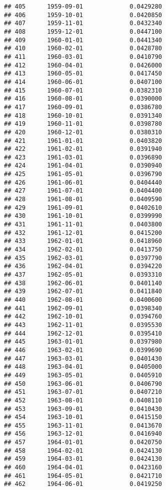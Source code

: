 \documentclass[
]{article}
\begin{document}
\begin{verbatim}
## 405      1959-09-01             0.0429280
## 406      1959-10-01             0.0420850
## 407      1959-11-01             0.0432340
## 408      1959-12-01             0.0447100
## 409      1960-01-01             0.0441340
## 410      1960-02-01             0.0428780
## 411      1960-03-01             0.0410790
## 412      1960-04-01             0.0426000
## 413      1960-05-01             0.0417450
## 414      1960-06-01             0.0407100
## 415      1960-07-01             0.0382310
## 416      1960-08-01             0.0390000
## 417      1960-09-01             0.0386780
## 418      1960-10-01             0.0391340
## 419      1960-11-01             0.0398780
## 420      1960-12-01             0.0380310
## 421      1961-01-01             0.0403820
## 422      1961-02-01             0.0391940
## 423      1961-03-01             0.0396890
## 424      1961-04-01             0.0390940
## 425      1961-05-01             0.0396790
## 426      1961-06-01             0.0404440
## 427      1961-07-01             0.0404400
## 428      1961-08-01             0.0409590
## 429      1961-09-01             0.0402610
## 430      1961-10-01             0.0399990
## 431      1961-11-01             0.0403800
## 432      1961-12-01             0.0415200
## 433      1962-01-01             0.0418960
## 434      1962-02-01             0.0413750
## 435      1962-03-01             0.0397790
## 436      1962-04-01             0.0394220
## 437      1962-05-01             0.0393310
## 438      1962-06-01             0.0401140
## 439      1962-07-01             0.0411840
## 440      1962-08-01             0.0400600
## 441      1962-09-01             0.0398340
## 442      1962-10-01             0.0394760
## 443      1962-11-01             0.0395530
## 444      1962-12-01             0.0395410
## 445      1963-01-01             0.0397980
## 446      1963-02-01             0.0399690
## 447      1963-03-01             0.0401430
## 448      1963-04-01             0.0405000
## 449      1963-05-01             0.0405910
## 450      1963-06-01             0.0406790
## 451      1963-07-01             0.0407210
## 452      1963-08-01             0.0408110
## 453      1963-09-01             0.0410430
## 454      1963-10-01             0.0415150
## 455      1963-11-01             0.0413670
## 456      1963-12-01             0.0416940
## 457      1964-01-01             0.0420750
## 458      1964-02-01             0.0424130
## 459      1964-03-01             0.0424130
## 460      1964-04-01             0.0423160
## 461      1964-05-01             0.0421710
## 462      1964-06-01             0.0419250

\end{verbatim}
\end{document}
